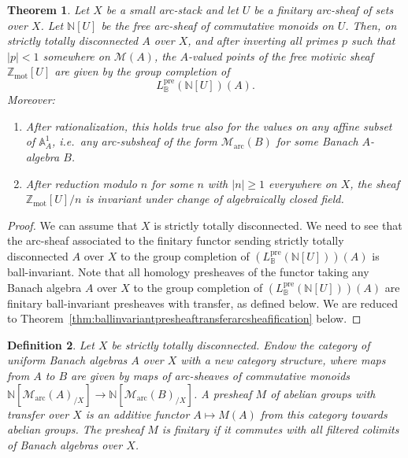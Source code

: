 \documentclass[11pt]{amsart}
\numberwithin{equation}{section}
\newtheorem{theorem}{Theorem}
\numberwithin{theorem}{section}
\newtheorem{definition}[theorem]{Definition}
\theoremstyle{definition}
\begin{document}
\begin{theorem}\label{thm:freemotivicsheaves} Let $X$ be a small arc-stack and let $U$ be a finitary arc-sheaf of sets over $X$. Let $\mathbb N[U]$ be the free arc-sheaf of commutative monoids on $U$. Then, on strictly totally disconnected $A$ over $X$, and after inverting all primes $p$ such that $|p|<1$ somewhere on $\mathcal M(A)$, the $A$-valued points of the free motivic sheaf $\mathbb Z_{\mathrm{mot}}[U]$ are given by the group completion of
\[
L_{\mathbb B}^{\mathrm{pre}}(\mathbb N[U])(A).
\]
Moreover:
\begin{enumerate}
\item[{\rm (i)}] After rationalization, this holds true also for the values on any affine subset of $\mathbb A^1_A$, i.e.~any arc-subsheaf of the form $\mathcal M_{\mathrm{arc}}(B)$ for some Banach $A$-algebra $B$. 
\item[{\rm (ii)}] After reduction modulo $n$ for some $n$ with $|n|\geq 1$ everywhere on $X$, the sheaf $\mathbb Z_{\mathrm{mot}}[U]/n$ is invariant under change of algebraically closed field.
\end{enumerate}
\end{theorem}

\begin{proof} We can assume that $X$ is strictly totally disconnected. We need to see that the arc-sheaf associated to the finitary functor sending strictly totally disconnected $A$ over $X$ to the group completion of $(L_{\mathbb B}^{\mathrm{pre}}(\mathbb N[U]))(A)$ is ball-invariant. Note that all homology presheaves of the functor taking any Banach algebra $A$ over $X$ to the group completion of $(L_{\mathbb B}^{\mathrm{pre}}(\mathbb N[U]))(A)$ are finitary ball-invariant presheaves with transfer, as defined below. We are reduced to Theorem~\ref{thm:ballinvariantpresheaftransferarcsheafification} below.
\end{proof}

\begin{definition} Let $X$ be strictly totally disconnected. Endow the category of uniform Banach algebras $A$ over $X$ with a new category structure, where maps from $A$ to $B$ are given by maps of arc-sheaves of commutative monoids $\mathbb N[\mathcal M_{\mathrm{arc}}(A)_{/X}]\to \mathbb N[\mathcal M_{\mathrm{arc}}(B)_{/X}]$. A presheaf $M$ of abelian groups with transfer over $X$ is an additive functor $A\mapsto M(A)$ from this category towards abelian groups. The presheaf $M$ is finitary if it commutes with all filtered colimits of Banach algebras over $X$.
\end{definition}
\end{document}
